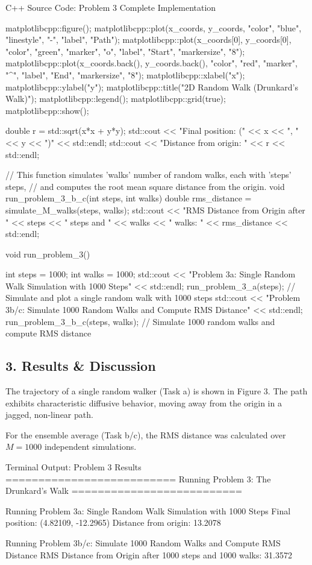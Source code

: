 \documentclass{article}
\begin{document}
\begin{codebox}{C++ Source Code: Problem 3 Complete Implementation}
{    matplotlibcpp::figure();
    matplotlibcpp::plot(x_coords, y_coords, {{"color", "blue"}, {"linestyle", "-"}, {"label", "Path"}});
    matplotlibcpp::plot({x_coords[0]}, {y_coords[0]}, {{"color", "green"}, {"marker", "o"}, {"label", "Start"}, {"markersize", "8"}});
    matplotlibcpp::plot({x_coords.back()}, {y_coords.back()}, {{"color", "red"}, {"marker", "^"}, {"label", "End"}, {"markersize", "8"}});
    matplotlibcpp::xlabel("x");
    matplotlibcpp::ylabel("y");
    matplotlibcpp::title("2D Random Walk (Drunkard's Walk)");
    matplotlibcpp::legend();
    matplotlibcpp::grid(true);
    matplotlibcpp::show();

    double r = std::sqrt(x*x + y*y);
    std::cout << "Final position: (" << x << ", " << y << ")" << std::endl;
    std::cout << "Distance from origin: " << r << std::endl;
}


// This function simulates 'walks' number of random walks, each with 'steps' steps, 
// and computes the root mean square distance from the origin.
void run_problem_3_b_c(int steps, int walks) {
    double rms_distance = simulate_M_walks(steps, walks);
    std::cout << "RMS Distance from Origin after " << steps 
              << " steps and " << walks 
              << " walks: " << rms_distance << std::endl;
}

void run_problem_3() {

    int steps = 1000;
    int walks = 1000;
    std::cout << "\nRunning Problem 3a: Single Random Walk Simulation with 1000 Steps" << std::endl;
    run_problem_3_a(steps); // Simulate and plot a single random walk with 1000 steps
    std::cout << "\nRunning Problem 3b/c: Simulate 1000 Random Walks and Compute RMS Distance" << std::endl;
    run_problem_3_b_c(steps, walks); // Simulate 1000 random walks and compute RMS distance
}
\end{codebox}


\subsection*{3. Results \& Discussion}
The trajectory of a single random walker (Task a) is shown in Figure 3. The path exhibits characteristic diffusive behavior, moving away from the origin in a jagged, non-linear path.

For the ensemble average (Task b/c), the RMS distance was calculated over $M=1000$ independent simulations.

\begin{outputbox}{Terminal Output: Problem 3 Results}
==========================
Running Problem 3: The Drunkard's Walk
==========================

Running Problem 3a: Single Random Walk Simulation with 1000 Steps
Final position: (4.82109, -12.2965)
Distance from origin: 13.2078

Running Problem 3b/c: Simulate 1000 Random Walks and Compute RMS Distance
RMS Distance from Origin after 1000 steps and 1000 walks: 31.3572
\end{outputbox}
\end{document}
